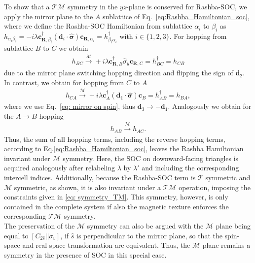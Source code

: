 To show that a $\mathcal{TM}$ symmetry in the $yz$-plane is conserved for Rashba-SOC, we apply the mirror plane to the $A$ sublattice of Eq.~\eqref{eq:Rashba_Hamiltonian_soc}, where we define the Rashba-SOC Hamiltonian from sublattice $\alpha_i$ to $\beta_i$ as $h_{\alpha_i\beta_i} = -i\lambda \mathbf{c}_{\mathbf{R},\beta_i}^\dagger (\mathbf{d}_i\cdot \bm{\hat{\sigma}})\mathbf{c}_{\mathbf{R},\alpha_i} = h^\dagger_{\beta_i\alpha_i}$ with $i\in\{1,2,3\}$.
For hopping from sublattice $B$ to $C$ we obtain
\begin{align}
    h_{BC}\xrightarrow{\mathcal{M}}  +i\lambda \mathbf{c}_{\mathbf{R},B}^\dagger \hat{\sigma}_y\mathbf{c}_{\mathbf{R},C} = h_{BC}^\dagger = h_{CB}
\end{align}
  due to the mirror plane switching hopping direction and flipping the sign of $\mathbf{d}_2$.
  In contrast, we obtain for hopping from $C$ to $A$ 
  \begin{align}
      h_{CA}\xrightarrow{\mathcal{M}}  +i\lambda \mathbf{c}_A^\dagger (\mathbf{d}_1\cdot \bm{\hat{\sigma}})\mathbf{c}_B =  h_{AB}^\dagger = h_{BA},
  \end{align}
 where we use Eq.~\eqref{eq: mirror on spin}, thus $\mathbf{d}_3 \to -\mathbf{d}_1$. Analogously we obtain for the $A\to B$ hopping
 \begin{align}
     h_{AB}\xrightarrow{\mathcal{M}}  h_{AC}.
 \end{align}
 Thus, the sum of all hopping terms, including the reverse hopping terms, according to Eq.\eqref{eq:Rashba_Hamiltonian_soc}, leaves the Rashba Hamiltonian invariant under $\mathcal{M}$ symmetry. Here, the SOC on downward-facing triangles is acquired analogously after relabeling $\lambda$ by $\lambda'$ and including the corresponding intercell indices. Additionally, because the Rashba-SOC term is $\mathcal{T}$ symmetric and $\mathcal{M}$ symmetric, as shown, it is also invariant under a $\mathcal{TM}$ operation, imposing the constraints given in \eqref{eq: symmetry_TM}. This symmetry, however, is only contained in the complete system if also the magnetic texture enforces the corresponding $\mathcal{TM}$ symmetry. \\
 
The preservation of the $\mathcal{M}$ symmetry can also be argued with the $\mathcal{M}$ plane being equal to $[C_{2\hat{s}}||\sigma_v]$, if $\hat{s}$ is perpendicular to the mirror plane, so that the spin-space and real-space transformation are equivalent. Thus, the $\mathcal{M}$ plane remains a symmetry in the presence of SOC in this special case.\\

